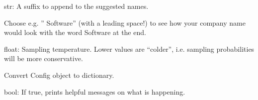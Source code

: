 \documentclass[letterpaper,10pt,english]{sphinxmanual}
\begin{document}
\begin{fulllineitems}
\begin{fulllineitems}
\end{fulllineitems}


\begin{fulllineitems}
\label{\detokenize{modules:sng.Config.Config.suffix}}
str: A suffix to append to the suggested names.

Choose e.g. ” Software” (with a leading space!) to see how your
company name would look with the word Software at the end.

\end{fulllineitems}


\begin{fulllineitems}
\label{\detokenize{modules:sng.Config.Config.temperature}}
float: Sampling temperature. Lower values are “colder”, i.e.
sampling probabilities will be more conservative.

\end{fulllineitems}


\begin{fulllineitems}
\label{\detokenize{modules:sng.Config.Config.to_dict}}
Convert Config object to dictionary.

\end{fulllineitems}


\begin{fulllineitems}
\label{\detokenize{modules:sng.Config.Config.verbose}}
bool: If true, prints helpful messages on what is happening.

\end{fulllineitems}


\end{fulllineitems}
\end{document}
